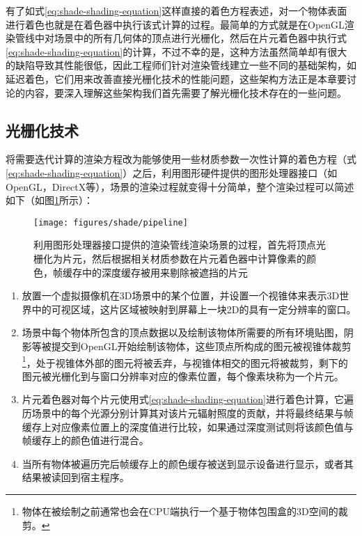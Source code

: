 有了如式\ref{eq:shade-shading-equation}这样直接的着色方程表述，对一个物体表面进行着色也就是在着色器中执行该式计算的过程。最简单的方式就是在OpenGL渲染管线中对场景中的所有几何体的顶点进行光栅化，然后在片元着色器中执行式\ref{eq:shade-shading-equation}的计算，不过不幸的是，这种方法虽然简单却有很大的缺陷导致其性能很低，因此工程师们针对渲染管线建立一些不同的基础架构，如延迟着色，它们用来改善直接光栅化技术的性能问题，这些架构方法正是本章要讨论的内容，要深入理解这些架构我们首先需要了解光栅化技术存在的一些问题。





\subsection{光栅化技术}
将需要迭代计算的渲染方程改为能够使用一些材质参数一次性计算的着色方程（式\ref{eq:shade-shading-equation}）之后，利用图形硬件提供的图形处理器接口（如OpenGL，DirectX等），场景的渲染过程就变得十分简单，整个渲染过程可以简述如下（如图\ref{f:shade-pipeline}所示）：

\begin{figure}
\begin{center}
	\texttt{[image: figures/shade/pipeline]}
\end{center}
	\caption{利用图形处理器接口提供的渲染管线渲染场景的过程，首先将顶点光栅化为片元，然后根据相关材质参数在片元着色器中计算像素的颜色，帧缓存中的深度缓存被用来剔除被遮挡的片元}
	\label{f:shade-pipeline}
\end{figure}

\begin{enumerate}
	\item 放置一个虚拟摄像机在3D场景中的某个位置，并设置一个视锥体来表示3D世界中的可视区域，这片区域被映射到屏幕上一块2D的具有一定分辨率的窗口。
	\item 场景中每个物体所包含的顶点数据以及绘制该物体所需要的所有环境贴图，阴影等被提交到OpenGL开始绘制该物体，这些顶点所构成的图元被视锥体裁剪\footnote{物体在被绘制之前通常也会在CPU端执行一个基于物体包围盒的3D空间的裁剪。}，处于视锥体外部的图元将被丢弃，与视锥体相交的图元将被裁剪，剩下的图元被光栅化到与窗口分辨率对应的像素位置，每个像素块称为一个片元。
	\item 片元着色器对每个片元使用式\ref{eq:shade-shading-equation}进行着色计算，它遍历场景中的每个光源分别计算其对该片元辐射照度的贡献，并将最终结果与帧缓存上对应像素位置上的深度值进行比较，如果通过深度测试则将该颜色值与帧缓存上的颜色值进行混合。
	\item 当所有物体被遍历完后帧缓存上的颜色缓存被送到显示设备进行显示，或者其结果被读回到宿主程序。
\end{enumerate}

